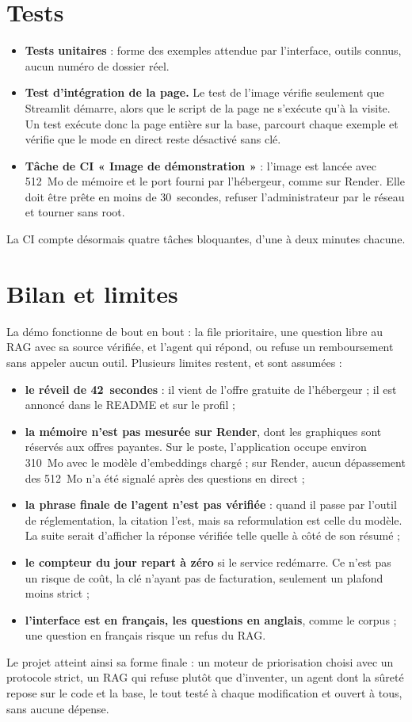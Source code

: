 \documentclass[11pt,a4paper]{article}
\begin{document}
\section{Tests}

\begin{itemize}
  \item \textbf{Tests unitaires} : forme des exemples attendue par l'interface, outils connus, aucun numéro de dossier réel.
  \item \textbf{Test d'intégration de la page.} Le test de l'image vérifie seulement que Streamlit démarre, alors que le script de la page ne s'exécute qu'à la visite. Un test exécute donc la page entière sur la base, parcourt chaque exemple et vérifie que le mode en direct reste désactivé sans clé.
  \item \textbf{Tâche de CI « Image de démonstration »} : l'image est lancée avec 512~Mo de mémoire et le port fourni par l'hébergeur, comme sur Render. Elle doit être prête en moins de 30~secondes, refuser l'administrateur par le réseau et tourner sans root.
\end{itemize}

La CI compte désormais quatre tâches bloquantes, d'une à deux minutes chacune.

\section{Bilan et limites}

La démo fonctionne de bout en bout : la file prioritaire, une question libre au RAG avec sa source vérifiée, et l'agent qui répond, ou refuse un remboursement sans appeler aucun outil. Plusieurs limites restent, et sont assumées :
\begin{itemize}
  \item \textbf{le réveil de 42~secondes} : il vient de l'offre gratuite de l'hébergeur ; il est annoncé dans le README et sur le profil ;
  \item \textbf{la mémoire n'est pas mesurée sur Render}, dont les graphiques sont réservés aux offres payantes. Sur le poste, l'application occupe environ 310~Mo avec le modèle d'embeddings chargé ; sur Render, aucun dépassement des 512~Mo n'a été signalé après des questions en direct ;
  \item \textbf{la phrase finale de l'agent n'est pas vérifiée} : quand il passe par l'outil de réglementation, la citation l'est, mais sa reformulation est celle du modèle. La suite serait d'afficher la réponse vérifiée telle quelle à côté de son résumé ;
  \item \textbf{le compteur du jour repart à zéro} si le service redémarre. Ce n'est pas un risque de coût, la clé n'ayant pas de facturation, seulement un plafond moins strict ;
  \item \textbf{l'interface est en français, les questions en anglais}, comme le corpus ; une question en français risque un refus du RAG.
\end{itemize}

Le projet atteint ainsi sa forme finale : un moteur de priorisation choisi avec un protocole strict, un RAG qui refuse plutôt que d'inventer, un agent dont la sûreté repose sur le code et la base, le tout testé à chaque modification et ouvert à tous, sans aucune dépense.
\end{document}
